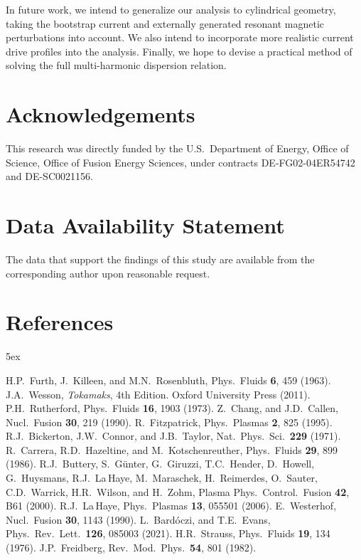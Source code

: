 \documentclass[12pt,prb,aps]{revtex4-1}
\begin{document}
In future work, we intend to generalize our analysis to cylindrical geometry, taking the bootstrap current and externally
generated resonant magnetic perturbations into account. We also intend to incorporate more realistic current drive
profiles into the analysis. Finally, we hope to devise a practical method of solving the full multi-harmonic dispersion
relation. 

\section*{Acknowledgements}
This research was directly funded by the U.S.\ Department of Energy, Office of Science, Office of Fusion Energy Sciences,  under  contracts DE-FG02-04ER54742 and DE-SC0021156. 

\section*{Data Availability Statement}
The data that support the findings of this study are available from the corresponding author upon reasonable request.

\section*{References}
\begin{thebibliography}{99}\baselineskip 5ex

 H.P.~Furth, J.~Killeen, and M.N.~Rosenbluth, Phys.\ Fluids {\bf 6}, 459 (1963).
 J.A.~Wesson, {\em Tokamaks}, 4th Edition. Oxford University Press (2011).
 P.H.~Rutherford,  Phys.\ Fluids {\bf 16}, 1903 (1973).
 Z.~Chang, and J.D.~Callen, Nucl.\ Fusion {\bf 30}, 219 (1990).
 R.~Fitzpatrick, Phys.\ Plasmas {\bf 2}, 825 (1995).
 R.J.~Bickerton, J.W.~Connor, and J.B.~Taylor, Nat.\ Phys.\ Sci.\ {\bf 229} (1971).
 R.~Carrera, R.D.~Hazeltine, and M.~Kotschenreuther, Phys.\ Fluids {\bf 29},
899 (1986). 
 R.J.~Buttery, S.~G\"{u}nter, G.~Giruzzi, T.C.~Hender, D.~Howell,
G.~Huysmans, R.J.~La\,Haye, M.~Maraschek, H.~Reimerdes, O.~Sauter,
C.D.~Warrick, H.R.~Wilson, and H.~Zohm, Plasma Phys.\ Control.\ Fusion
{\bf 42}, B61 (2000). 
 R.J.~La\,Haye, Phys.\ Plasmas {\bf 13}, 055501 (2006). 
 E.~Westerhof, Nucl.\ Fusion {\bf 30}, 1143 (1990). 
 L.~Bard\'{o}czi, and T.E.~Evans, Phys.\ Rev.\ Lett.\ {\bf 126}, 085003 (2021).
 H.R.~Strauss, Phys.\  Fluids {\bf 19}, 134 (1976). 
 J.P.~Freidberg, Rev.\ Mod.\ Phys.\ {\bf 54}, 801 (1982). 

\end{thebibliography}
\end{document}
